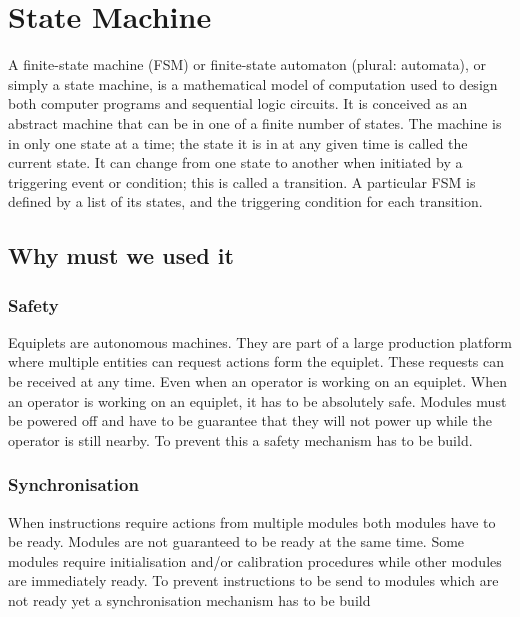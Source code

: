 \documentclass[12pt,a4paper]{report}
\begin{document}
\section{State Machine}
A finite-state machine (FSM) or finite-state automaton (plural: automata), or simply a state machine, is a mathematical model of computation used to design both computer programs and sequential logic circuits. It is conceived as an abstract machine that can be in one of a finite number of states. The machine is in only one state at a time; the state it is in at any given time is called the current state. It can change from one state to another when initiated by a triggering event or condition; this is called a transition. A particular FSM is defined by a list of its states, and the triggering condition for each transition.\cite{state_machine}
\subsection{Why must we used it}
\subsubsection{Safety}
Equiplets are autonomous machines. 
They are part of a large production platform where multiple entities can request actions form the equiplet.
These requests can be received at any time.
Even when an operator is working on an equiplet.
When an operator is working on an equiplet, it has to be absolutely safe.
Modules must be powered off and have to be guarantee that they will not power up while the operator is still nearby.
To prevent this a safety mechanism has to be build.
\subsubsection{Synchronisation}
When instructions require actions from multiple modules both modules have to be ready.
Modules are not guaranteed to be ready at the same time. Some modules require initialisation  and/or calibration procedures while other modules are immediately ready.
To prevent instructions to be send to modules which are not ready yet a synchronisation mechanism has to be build
\end{document}
